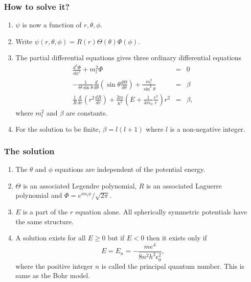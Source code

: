 \documentclass{beamer}
\begin{document}
\begin{frame}
\frametitle{How to solve it?}
\begin{enumerate}
\item $\psi$ is now a function of $r, \theta, \phi$.
\item Write $\psi(r, \theta, \phi) = R(r)\Theta(\theta)\Phi(\phi)$.
\item The partial differential equations gives three ordinary differential 
equations
\begin{eqnarray}
\frac{d^2\Phi}{d\phi^2} + m_l^2\Phi &=& 0 \label{e5} \\
-\frac{1}{\Theta\sin\theta}\frac{d}{d\theta}
\left(\sin\theta\frac{d\Theta}{d\theta}\right) +\frac{m_l^2}{\sin^2\theta} &=& 
\beta \label{e6} \\
\frac{1}{R}\frac{d}{dr}\left(r^2\frac{dR}{dr}\right) +
\frac{2m}{\hslash^2}\left(E + \frac{1}{4\pi\epsilon_0}\frac{e^2}{r}\right)r^2&=&
\beta, \label{e7}
\end{eqnarray}
where $m_l^2$ and $\beta$ are constants.
\item For the solution to be finite, $\beta = l(l+1)$ where $l$ is a non-negative
integer.
\end{enumerate}
\end{frame}

\begin{frame}
\frametitle{The solution}
\begin{enumerate}
\item The $\theta$ and $\phi$ equations are independent of the potential energy.
\item $\Theta$ is an associated Legendre polynomial, $R$ is an associated 
Laguerre polynomial and $\Phi = e^{im_l\phi}/\sqrt{2\pi}$.
\item $E$ is a part of the $r$ equation alone. All spherically symmetric 
potentials have the same structure.
\item A solution exists for all $E \ge 0$ but if $E < 0$ then it exists only if
\begin{equation}\label{e8}
E = E_n = -\frac{me^4}{8n^2h^2\epsilon_0^2},
\end{equation}
where the positive integer $n$ is called the principal quantum number. This is 
same as the Bohr model.
\end{enumerate}
\end{frame}
\end{document}

